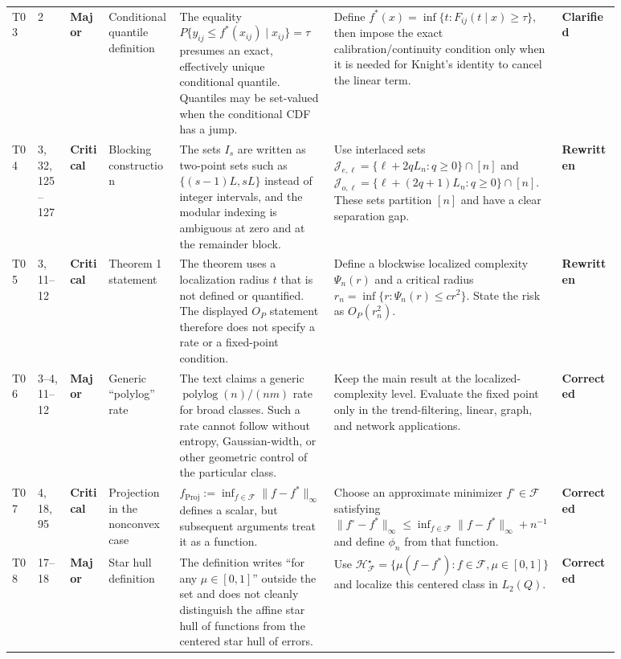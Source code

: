 \documentclass[11pt]{article}
\newcommand{\status}[1]{\textcolor{implgreen}{\textbf{#1}}}
\begin{document}
\begin{landscape}
\begin{longtable}{L{0.04\linewidth}L{0.055\linewidth}L{0.065\linewidth}L{0.11\linewidth}L{0.245\linewidth}L{0.275\linewidth}L{0.095\linewidth}}
T03 & 2 & \textcolor{major}{\textbf{Major}} & Conditional quantile definition & The equality $P\{y_{ij}\le f^*(x_{ij})\mid x_{ij}\}=\tau$ presumes an exact, effectively unique conditional quantile. Quantiles may be set-valued when the conditional CDF has a jump. & Define $f^*(x)=\inf\{t:F_{ij}(t\mid x)\ge\tau\}$, then impose the exact calibration/continuity condition only when it is needed for Knight’s identity to cancel the linear term. & \status{Clarified}\\
T04 & 3, 32, 125--127 & \textcolor{crit}{\textbf{Critical}} & Blocking construction & The sets $I_s$ are written as two-point sets such as $\{(s-1)L,sL\}$ instead of integer intervals, and the modular indexing is ambiguous at zero and at the remainder block. & Use interlaced sets $\mathcal J_{e,\ell}=\{\ell+2qL_n:q\ge0\}\cap[n]$ and $\mathcal J_{o,\ell}=\{\ell+(2q+1)L_n:q\ge0\}\cap[n]$. These sets partition $[n]$ and have a clear separation gap. & \status{Rewritten}\\
T05 & 3, 11--12 & \textcolor{crit}{\textbf{Critical}} & Theorem 1 statement & The theorem uses a localization radius $t$ that is not defined or quantified. The displayed $O_P$ statement therefore does not specify a rate or a fixed-point condition. & Define a blockwise localized complexity $\Psi_n(r)$ and a critical radius $r_n=\inf\{r:\Psi_n(r)\le c r^2\}$. State the risk as $O_P(r_n^2)$. & \status{Rewritten}\\
T06 & 3--4, 11--12 & \textcolor{major}{\textbf{Major}} & Generic “polylog” rate & The text claims a generic $\operatorname{polylog}(n)/(nm)$ rate for broad classes. Such a rate cannot follow without entropy, Gaussian-width, or other geometric control of the particular class. & Keep the main result at the localized-complexity level. Evaluate the fixed point only in the trend-filtering, linear, graph, and network applications. & \status{Corrected}\\
T07 & 4, 18, 95 & \textcolor{crit}{\textbf{Critical}} & Projection in the nonconvex case & $f_{\mathrm{Proj}}:=\inf_{f\in\mathcal F}\|f-f^*\|_\infty$ defines a scalar, but subsequent arguments treat it as a function. & Choose an approximate minimizer $f^\circ\in\mathcal F$ satisfying $\|f^\circ-f^*\|_\infty\le\inf_{f\in\mathcal F}\|f-f^*\|_\infty+n^{-1}$ and define $\phi_n$ from that function. & \status{Corrected}\\
T08 & 17--18 & \textcolor{major}{\textbf{Major}} & Star hull definition & The definition writes “for any $\mu\in[0,1]$” outside the set and does not cleanly distinguish the affine star hull of functions from the centered star hull of errors. & Use $\mathcal H_{\mathcal F}^\star=\{\mu(f-f^*):f\in\mathcal F,\mu\in[0,1]\}$ and localize this centered class in $L_2(Q)$. & \status{Corrected}\\

\end{longtable}
\end{landscape}
\end{document}
